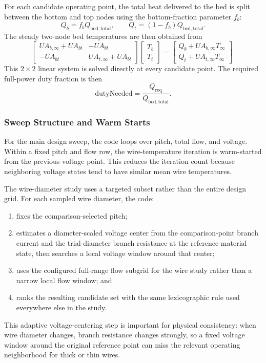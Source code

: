 \documentclass{article}
\begin{document}
For each candidate operating point, the total heat delivered to the bed is
split between the bottom and top nodes using the bottom-fraction parameter
$f_b$:
\begin{equation}
Q_b = f_b Q_{\mathrm{bed,total}},
\qquad
Q_t = (1-f_b)Q_{\mathrm{bed,total}}.
\end{equation}
The steady two-node bed temperatures are then obtained from
\begin{equation}
\begin{bmatrix}
UA_{b,\infty} + UA_{bt} & -UA_{bt} \\
-UA_{bt} & UA_{t,\infty} + UA_{bt}
\end{bmatrix}
\begin{bmatrix}
T_b \\ T_t
\end{bmatrix}
=
\begin{bmatrix}
Q_b + UA_{b,\infty} T_\infty \\
Q_t + UA_{t,\infty} T_\infty
\end{bmatrix}.
\end{equation}
This $2\times2$ linear system is solved directly at every candidate point.
The required full-power duty fraction is then
\begin{equation}
\mathrm{dutyNeeded}
= \frac{Q_{\mathrm{req}}}{Q_{\mathrm{bed,total}}}.
\end{equation}

\subsubsection{Sweep Structure and Warm Starts}

For the main design sweep, the code loops over pitch, total flow, and
voltage. Within a fixed pitch and flow row, the wire-temperature iteration is
warm-started from the previous voltage point. This reduces the iteration
count because neighboring voltage states tend to have similar mean wire
temperatures.

The wire-diameter study uses a targeted subset rather than the entire design
grid. For each sampled wire diameter, the code:
\begin{enumerate}
\item fixes the comparison-selected pitch;
\item estimates a diameter-scaled voltage center from the comparison-point
      branch current and the trial-diameter branch resistance at the reference
      material state, then searches a local voltage window around that center;
\item uses the configured full-range flow subgrid for the wire study rather
      than a narrow local flow window; and
\item ranks the resulting candidate set with the same lexicographic rule used
      everywhere else in the study.
\end{enumerate}
This adaptive voltage-centering step is important for physical consistency:
when wire diameter changes, branch resistance changes strongly, so a fixed
voltage window around the original reference point can miss the relevant
operating neighborhood for thick or thin wires.
\end{document}
